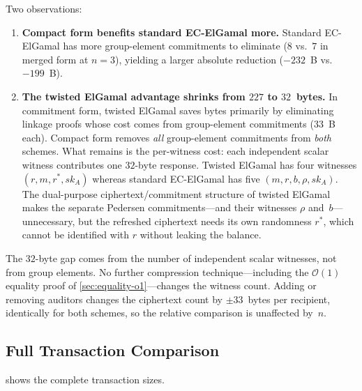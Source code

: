 \documentclass[11pt]{article}
\theoremstyle{definition}
\newcommand{\sk}{\mathit{sk}}
\begin{document}
\noindent
Two observations:

\begin{enumerate}
  \item \textbf{Compact form benefits standard EC-ElGamal more.}
    Standard EC-ElGamal has more group-element commitments to
    eliminate ($8$ vs.\ $7$ in merged form at $n = 3$), yielding a larger
    absolute reduction ($-232$~B vs.\ $-199$~B).

  \item \textbf{The twisted ElGamal advantage shrinks from $227$ to
    $32$~bytes.}
    In commitment form, twisted ElGamal saves bytes primarily by
    eliminating linkage proofs whose cost comes from group-element
    commitments ($33$~B each).
    Compact form removes \emph{all} group-element commitments from
    \emph{both} schemes.
    What remains is the per-witness cost: each independent
    scalar witness contributes one $32$-byte response.
    Twisted ElGamal has four witnesses $(r, m, r^*, \sk_A)$ whereas
    standard EC-ElGamal has five $(m, r, b, \rho, \sk_A)$.
    The dual-purpose ciphertext/commitment structure of twisted
    ElGamal makes the separate Pedersen commitments---and their
    witnesses $\rho$ and~$b$---unnecessary, but the refreshed
    ciphertext needs its own randomness $r^*$, which cannot be
    identified with $r$ without leaking the balance.
\end{enumerate}

\noindent
The $32$-byte gap comes from the number of independent scalar witnesses,
not from group elements.
No further compression technique---including the $\mathcal{O}(1)$
equality proof of \cref{sec:equality-o1}---changes the witness count.
Adding or removing auditors changes the ciphertext count by
$\pm 33$~bytes per recipient, identically for both schemes, so the
relative comparison is unaffected by~$n$.

\subsection{Full Transaction Comparison}

 shows the complete transaction sizes.
\end{document}
